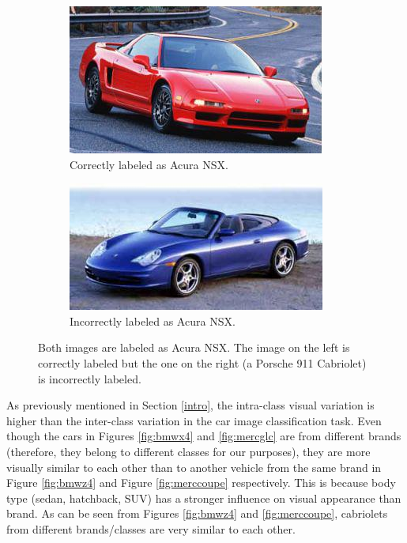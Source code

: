 \documentclass[conference]{IEEEtran}
\begin{document}
\begin{figure}[t]
    \centering
    \begin{subfigure}[b]{0.48\linewidth}        %
        \centering
        \includegraphics[width=0.96\linewidth]{Acura_NSX_2001_84_16_250_30_6_71_46_174_17_RWD_2_2_2dr_VcY.jpg}
        \caption{Correctly labeled as Acura NSX.}
        \label{fig:A}
    \end{subfigure}
    \begin{subfigure}[b]{0.48\linewidth}        %
        \centering
        \includegraphics[width=0.96\linewidth]{Acura_NSX_2003_89_17_250_30_6_71_46_174_17_RWD_2_2_2dr_BGc.jpg}
        \caption{Incorrectly labeled as Acura NSX.}
        \label{fig:B}
    \end{subfigure}
    \caption{Both images are labeled as Acura NSX. The image on the left is correctly labeled but the one on the right (a Porsche 911 Cabriolet) is incorrectly labeled.}
    \label{fig:acura}
\end{figure}

As previously mentioned in Section \ref{intro}, the intra-class visual variation is higher than the inter-class variation in the car image classification task. Even though the cars in Figures \ref{fig:bmwx4} and \ref{fig:mercglc} are from different brands (therefore, they belong to different classes for our purposes), they are more visually similar to each other than to another vehicle from the same brand in Figure \ref{fig:bmwz4} and Figure \ref{fig:merccoupe} respectively. This is because body type (sedan, hatchback, SUV) has a stronger influence on visual appearance than brand. As can be seen from Figures \ref{fig:bmwz4} and \ref{fig:merccoupe}, cabriolets from different brands/classes are very similar to each other.
\end{document}
